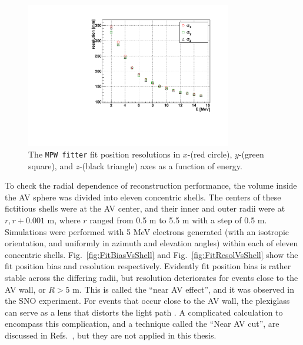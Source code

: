 \begin{figure}[htbp]
	\centering	
	\includegraphics[width=9cm]{MPW_isoFill_posResolVsE.pdf}
	\caption[The \texttt{MPW fitter} fit position resolutions ($\sigma_{x,y,z}$) as a function of energy.]{The \texttt{MPW fitter} fit position resolutions in $x$-(red circle), $y$-(green square), and $z$-(black triangle) axes as a function of energy.	\label{fig:MPWposResol_isoFill}}
\end{figure}

To check the radial dependence of reconstruction performance, the volume inside the AV sphere was divided into eleven concentric shells. The centers of these fictitious shells were at the AV center, and their inner and outer radii were at $r, r+0.001$ m, where $r$ ranged from 0.5 m to 5.5 m with a step of 0.5 m. Simulations were performed with 5 MeV electrons generated (with an isotropic orientation, and uniformly in azimuth and elevation angles) within each of eleven concentric shells. Fig.~\ref{fig:FitBiasVsShell} and Fig.~\ref{fig:FitResolVsShell} show the fit position bias and resolution respectively. Evidently fit position bias is rather stable across the differing radii, but resolution deteriorates for events close to the AV wall, or $R>5$ m. This is called the ``near AV effect'', and it was observed in the SNO experiment. For events that occur close to the AV wall, the plexiglass can serve as a lens that distorts the light path \cite{brice1996monte}. A complicated calculation to encompass this complication, and a technique called the ``Near AV cut'', are discussed in Refs.~\cite{jones2011background,coulter2013modelling}, but they are not applied in this thesis. 

